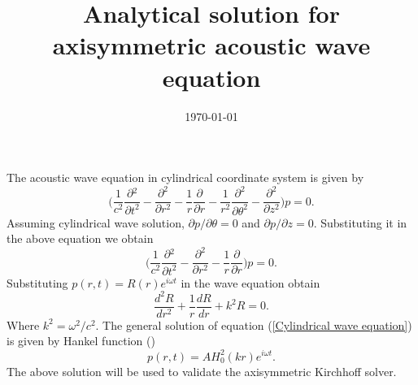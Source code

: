 \documentclass[a4paper]{article}
\title{Analytical solution for axisymmetric acoustic wave equation}
\author{}
\date{\today}
\begin{document}
\maketitle
The acoustic wave equation in cylindrical coordinate system is given by
\begin{equation}\label{Wave equation}
	\Bigg( \frac{1}{c^2}\frac{\partial{}^{2}}{\partial{t}^{2}}- \frac{\partial^2}{\partial r^2} - \frac{1}{r}\frac{\partial}{\partial r}  - \frac{1}{r^2}\frac{\partial^2}{\partial \theta^2} - \frac{\partial^2}{\partial z^2} \Bigg) p = 0.
\end{equation}
Assuming cylindrical wave solution, $\partial p/\partial \theta = 0$ and $\partial p/\partial z = 0$. Substituting it in the above equation we obtain
\begin{equation}\label{Cylindrical wave equation}
	\Bigg( \frac{1}{c^2}\frac{\partial{}^{2}}{\partial{t}^{2}}- \frac{\partial^2}{\partial r^2} - \frac{1}{r}\frac{\partial}{\partial r}  \Bigg) p = 0.
\end{equation}
Substituting $p(r, t) = R(r)e^{i\omega t}$ in the wave equation obtain
\begin{equation}
	\frac{d^2 R}{dr^2} + \frac{1}{r}\frac{dR}{dr} + k^2R = 0.
\end{equation}
Where $k^2 = {\omega^2}/{c^2}$. The general solution of equation (\ref{Cylindrical wave equation}) is given by Hankel function (\cite{kinsler2000fundamentals})
\begin{equation}
	p(r, t) = AH_{0}^2(kr)e^{i\omega t}.
\end{equation}
The above solution will be used to validate the axisymmetric Kirchhoff solver.


\printbibliography
\end{document}
